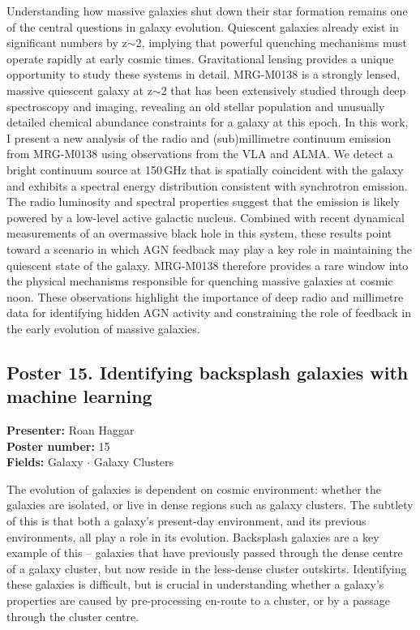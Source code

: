 Understanding how massive galaxies shut down their star formation remains one of the central questions in galaxy evolution. Quiescent galaxies already exist in significant numbers by z$\sim$2, implying that powerful quenching mechanisms must operate rapidly at early cosmic times. Gravitational lensing provides a unique opportunity to study these systems in detail. MRG-M0138 is a strongly lensed, massive quiescent galaxy at z$\sim$2 that has been extensively studied through deep spectroscopy and imaging, revealing an old stellar population and unusually detailed chemical abundance constraints for a galaxy at this epoch. In this work, I present a new analysis of the radio and (sub)millimetre continuum emission from MRG-M0138 using observations from the VLA and ALMA. We detect a bright continuum source at 150\,GHz that is spatially coincident with the galaxy and exhibits a spectral energy distribution consistent with synchrotron emission. The radio luminosity and spectral properties suggest that the emission is likely powered by a low-level active galactic nucleus. Combined with recent dynamical measurements of an overmassive black hole in this system, these results point toward a scenario in which AGN feedback may play a key role in maintaining the quiescent state of the galaxy. MRG-M0138 therefore provides a rare window into the physical mechanisms responsible for quenching massive galaxies at cosmic noon. These observations highlight the importance of deep radio and millimetre data for identifying hidden AGN activity and constraining the role of feedback in the early evolution of massive galaxies.

\hypertarget{poster-abstract-talk-202}{}\label{poster-abstract-page-talk-202}
\subsection*{Poster 15. Identifying backsplash galaxies with machine learning}
\textbf{Presenter:} Roan Haggar\\
\textbf{Poster number:} 15\\
\textbf{Fields:} Galaxy $\cdot$ Galaxy Clusters

The evolution of galaxies is dependent on cosmic environment: whether the galaxies are isolated, or live in dense regions such as galaxy clusters. The subtlety of this is that both a galaxy's present-day environment, and its previous environments, all play a role in its evolution. Backsplash galaxies are a key example of this -- galaxies that have previously passed through the dense centre of a galaxy cluster, but now reside in the less-dense cluster outskirts. Identifying these galaxies is difficult, but is crucial in understanding whether a galaxy's properties are caused by pre-processing en-route to a cluster, or by a passage through the cluster centre.

